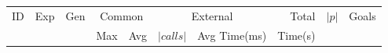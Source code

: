 


\begin{table}[ht]
  \tiny
    \centering
        \begin{tabular}{lrrrrrrrrl}
        \toprule
        \multirow{2}{*}{ID} & \multirow{2}{*}{Exp} & \multirow{2}{*}{Gen} & \multicolumn{2}{c}{Common} & \multicolumn{2}{c}{External}  & Total & \multirow{2}{*}{$|p|$} & \multirow{2}{*}{Goals} \\ 
        & & & Max & Avg & $|calls|$ & Avg Time(ms) & Time(s) & & \\
        
        \midrule



\end{tabular}
\end{table}
